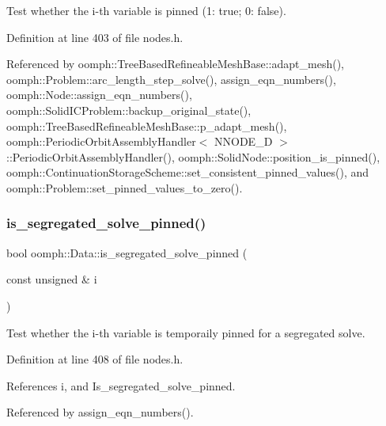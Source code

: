 Test whether the i-\/th variable is pinned (1\+: true; 0\+: false). 



Definition at line 403 of file nodes.\+h.



Referenced by oomph\+::\+Tree\+Based\+Refineable\+Mesh\+Base\+::adapt\+\_\+mesh(), oomph\+::\+Problem\+::arc\+\_\+length\+\_\+step\+\_\+solve(), assign\+\_\+eqn\+\_\+numbers(), oomph\+::\+Node\+::assign\+\_\+eqn\+\_\+numbers(), oomph\+::\+Solid\+I\+C\+Problem\+::backup\+\_\+original\+\_\+state(), oomph\+::\+Tree\+Based\+Refineable\+Mesh\+Base\+::p\+\_\+adapt\+\_\+mesh(), oomph\+::\+Periodic\+Orbit\+Assembly\+Handler$<$ N\+N\+O\+D\+E\+\_\+D $>$\+::\+Periodic\+Orbit\+Assembly\+Handler(), oomph\+::\+Solid\+Node\+::position\+\_\+is\+\_\+pinned(), oomph\+::\+Continuation\+Storage\+Scheme\+::set\+\_\+consistent\+\_\+pinned\+\_\+values(), and oomph\+::\+Problem\+::set\+\_\+pinned\+\_\+values\+\_\+to\+\_\+zero().

\mbox{\label{classoomph_1_1Data_a46bcce858da1ca61069329fda4876171}} 
\subsubsection{\texorpdfstring{is\+\_\+segregated\+\_\+solve\+\_\+pinned()}{is\_segregated\_solve\_pinned()}}
{\footnotesize\ttfamily bool oomph\+::\+Data\+::is\+\_\+segregated\+\_\+solve\+\_\+pinned (\begin{DoxyParamCaption}\item[{const unsigned \&}]{i }\end{DoxyParamCaption})\hspace{0.3cm}{\ttfamily [inline]}}



Test whether the i-\/th variable is temporaily pinned for a segregated solve. 



Definition at line 408 of file nodes.\+h.



References i, and Is\+\_\+segregated\+\_\+solve\+\_\+pinned.



Referenced by assign\+\_\+eqn\+\_\+numbers().

